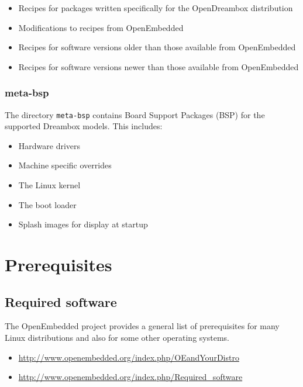 \documentclass[a4paper]{article}
\newcommand{\shell}[1]{\texttt{\small #1}}
\begin{document}
      \begin{itemize}
        \item Recipes for packages written specifically for the OpenDreambox distribution
        \item Modifications to recipes from OpenEmbedded
        \item Recipes for software versions older than those available from OpenEmbedded
        \item Recipes for software versions newer than those available from OpenEmbedded
      \end{itemize}

    \subsubsection{meta-bsp}
      The directory \shell{meta-bsp} contains Board Support Packages (BSP)
      for the supported Dreambox models. This includes:

      \begin{itemize}
        \item Hardware drivers
        \item Machine specific overrides
        \item The Linux kernel
        \item The boot loader
        \item Splash images for display at startup
      \end{itemize}

\section{Prerequisites}
  \label{prerequisites}

  \subsection{Required software}

   The OpenEmbedded project provides a general list of prerequisites for
   many Linux distributions and also for some other operating systems.

   \begin{itemize}
     \item \url{http://www.openembedded.org/index.php/OEandYourDistro}
     \item \url{http://www.openembedded.org/index.php/Required\_software}
   \end{itemize}
\end{document}
